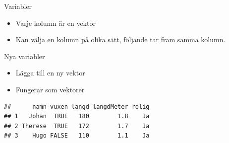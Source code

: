 \documentclass[
  11pt,
  ignorenonframetext,
]{beamer}
\newenvironment{Shaded}{\begin{snugshade}}{\end{snugshade}}
\newcommand{\DecValTok}[1]{\textcolor[rgb]{0.00,0.00,0.81}{#1}}
\newcommand{\FloatTok}[1]{\textcolor[rgb]{0.00,0.00,0.81}{#1}}
\newcommand{\KeywordTok}[1]{\textcolor[rgb]{0.13,0.29,0.53}{\textbf{#1}}}
\newcommand{\NormalTok}[1]{#1}
\newcommand{\OperatorTok}[1]{\textcolor[rgb]{0.81,0.36,0.00}{\textbf{#1}}}
\newcommand{\StringTok}[1]{\textcolor[rgb]{0.31,0.60,0.02}{#1}}
\providecommand{\tightlist}{%
  \setlength{\itemsep}{0pt}\setlength{\parskip}{0pt}}
\begin{document}
\begin{frame}[fragile]{Variabler}
\protect\hypertarget{variabler}{}
\begin{itemize}
\tightlist
\item
  Varje kolumn är en vektor
\item
  Kan välja en kolumn på olika sätt, följande tar fram samma kolumn.
\end{itemize}

\begin{Shaded}
\end{Shaded}
\end{frame}

\begin{frame}[fragile]{Nya variabler}
\protect\hypertarget{nya-variabler}{}
\begin{itemize}
\tightlist
\item
  Lägga till en ny vektor
\item
  Fungerar som vektorer
\end{itemize}

\begin{Shaded}
\end{Shaded}

\begin{verbatim}
##      namn vuxen langd langdMeter rolig
## 1   Johan  TRUE   180        1.8    Ja
## 2 Therese  TRUE   172        1.7    Ja
## 3    Hugo FALSE   110        1.1    Ja
\end{verbatim}
\end{frame}
\end{document}
